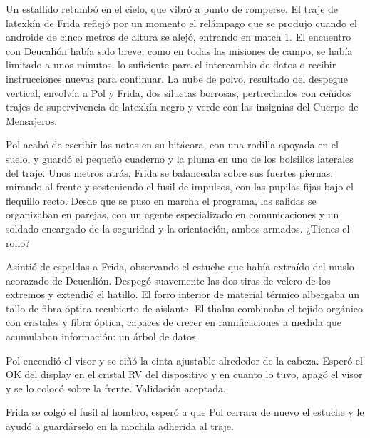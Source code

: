 Un estallido retumbó en el cielo, que vibró a punto de romperse. El traje de latexkín de Frida reflejó por un momento el relámpago que se produjo cuando el androide de cinco metros de altura se alejó, entrando en match 1. El encuentro con Deucalión había sido breve; como en todas las misiones de campo, se había limitado a unos minutos, lo suficiente para el intercambio de datos o recibir instrucciones nuevas para continuar. La nube de polvo, resultado del despegue vertical, envolvía a Pol y Frida, dos siluetas borrosas, pertrechados con ceñidos trajes de supervivencia de latexkín negro y verde con las insignias del Cuerpo de Mensajeros. 

Pol acabó de escribir las notas en su bitácora, con una rodilla apoyada en el suelo, y guardó el pequeño cuaderno y la pluma en uno de los bolsillos laterales del traje. Unos metros atrás, Frida se balanceaba sobre sus fuertes piernas, mirando al frente y sosteniendo el fusil de impulsos, con las pupilas fijas bajo el flequillo recto. Desde que se puso en marcha el programa, las salidas se organizaban en parejas, con un agente especializado en comunicaciones y un soldado encargado de la seguridad y la orientación, ambos armados. 
\reply ¿Tienes el rollo?

Asintió de espaldas a Frida, observando el estuche que había extraído del muslo acorazado de Deucalión. Despegó suavemente las dos tiras de velcro de los extremos y extendió el hatillo. El forro interior de material térmico albergaba un tallo de fibra óptica recubierto de aislante. El thalus combinaba el tejido orgánico con cristales y fibra óptica, capaces de crecer en ramificaciones a medida que acumulaban información: un árbol de datos. 

Pol encendió el visor y se ciñó la cinta ajustable alrededor de la cabeza. Esperó el OK del display en el cristal RV del dispositivo y en cuanto lo tuvo, apagó el visor y se lo colocó sobre la frente.
\reply Validación aceptada.
 
Frida se colgó el fusil al hombro, esperó a que Pol cerrara de nuevo el estuche y le ayudó a guardárselo en la mochila adherida al traje.